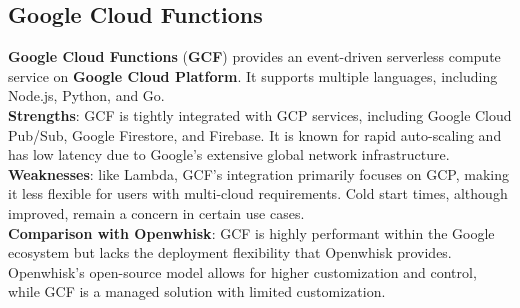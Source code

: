 \subsection{Google Cloud Functions}
\textbf{Google Cloud Functions} (\textbf{GCF}) provides an event-driven serverless compute service on \textbf{Google Cloud Platform}. It supports multiple languages, including Node.js, Python, and Go.\vspace{14pt}\\
\textbf{Strengths}: GCF is tightly integrated with GCP services, including Google Cloud Pub/Sub, Google Firestore, and Firebase. It is known for rapid auto-scaling and has low latency due to Google’s extensive global network infrastructure.\vspace{14pt}\\
\textbf{Weaknesses}: like Lambda, GCF’s integration primarily focuses on GCP, making it less flexible for users with multi-cloud requirements. Cold start times, although improved, remain a concern in certain use cases.\vspace{14pt}\\
\textbf{Comparison with Openwhisk}: GCF is highly performant within the Google ecosystem but lacks the deployment flexibility that Openwhisk provides. Openwhisk’s open-source model allows for higher customization and control, while GCF is a managed solution with limited customization.
